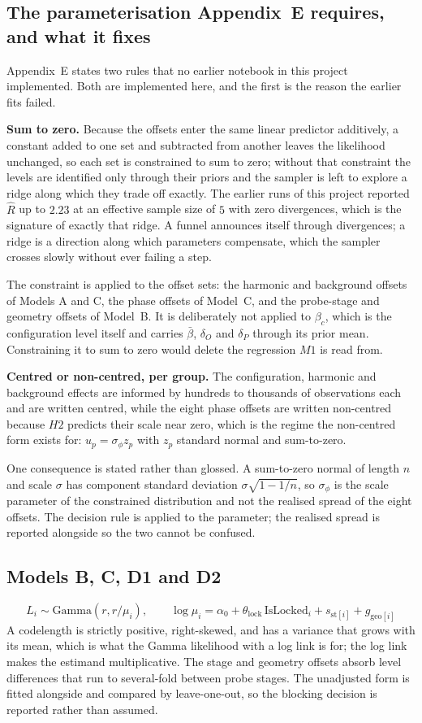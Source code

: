 \documentclass[10pt,a4paper]{article}
\begin{document}
\subsection{The parameterisation Appendix~E requires, and what it fixes}
Appendix~E states two rules that no earlier notebook in this project implemented. Both are implemented here, and the first is the reason the earlier fits failed.

\textbf{Sum to zero.} Because the offsets enter the same linear predictor additively, a constant added to one set and subtracted from another leaves the likelihood unchanged, so each set is constrained to sum to zero; without that constraint the levels are identified only through their priors and the sampler is left to explore a ridge along which they trade off exactly. The earlier runs of this project reported $\hat R$ up to $2.23$ at an effective sample size of $5$ with zero divergences, which is the signature of exactly that ridge. A funnel announces itself through divergences; a ridge is a direction along which parameters compensate, which the sampler crosses slowly without ever failing a step.

The constraint is applied to the offset sets: the harmonic and background offsets of Models A and C, the phase offsets of Model~C, and the probe-stage and geometry offsets of Model~B. It is deliberately not applied to $\beta_c$, which is the configuration level itself and carries $\bar\beta$, $\delta_O$ and $\delta_P$ through its prior mean. Constraining it to sum to zero would delete the regression $M1$ is read from.

\textbf{Centred or non-centred, per group.} The configuration, harmonic and background effects are informed by hundreds to thousands of observations each and are written centred, while the eight phase offsets are written non-centred because $H2$ predicts their scale near zero, which is the regime the non-centred form exists for: $u_p=\sigma_\phi z_p$ with $z_p$ standard normal and sum-to-zero.

One consequence is stated rather than glossed. A sum-to-zero normal of length $n$ and scale $\sigma$ has component standard deviation $\sigma\sqrt{1-1/n}$, so $\sigma_\phi$ is the scale parameter of the constrained distribution and not the realised spread of the eight offsets. The decision rule is applied to the parameter; the realised spread is reported alongside so the two cannot be confused.

\subsection{Models B, C, D1 and D2}
\[
L_i\sim\text{Gamma}(r,r/\mu_i),\qquad \log\mu_i=\alpha_0+\theta_{\mathrm{lock}}\,\mathrm{IsLocked}_i+s_{\mathrm{st}[i]}+g_{\mathrm{geo}[i]}
\]
A codelength is strictly positive, right-skewed, and has a variance that grows with its mean, which is what the Gamma likelihood with a log link is for; the log link makes the estimand multiplicative. The stage and geometry offsets absorb level differences that run to several-fold between probe stages. The unadjusted form is fitted alongside and compared by leave-one-out, so the blocking decision is reported rather than assumed.
\end{document}
